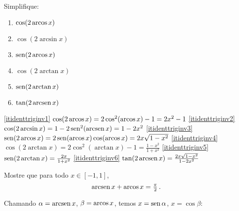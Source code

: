 \begin{exo} Simplifique:
\begin{multicols}{3}
 \begin{enumerate}
\item\label{itidenttriginv1} $\cos(2\operatorname{arcos} x)$
\item\label{itidenttriginv2} $\cos(2\arcsin x)$
\item\label{itidenttriginv3} $\operatorname{sen}(2\operatorname{arcos} x)$
\item\label{itidenttriginv4} $\cos(2\arctan x)$
\item\label{itidenttriginv5} $\operatorname{sen} (2\arctan x)$
\item\label{itidenttriginv6} $\tan (2\operatorname{arcsen} x)$
 \end{enumerate}
\end{multicols}
\vspace{0.01cm}
\begin{sol}
\eqref{itidenttriginv1} $\cos(2\operatorname{arcos} x)=2\cos^2(\operatorname{arcos} x)-1=2x^2-1$
\eqref{itidenttriginv2} $\cos(2\arcsin x)=1-2\operatorname{sen}^2(\operatorname{arcsen} x)=1-2x^2$
\eqref{itidenttriginv3} $\operatorname{sen}(2\operatorname{arcos} x)=2\operatorname{sen} (\operatorname{arcos} x)\cos (\operatorname{arcos} x)=2x\sqrt{1-x^2}$
\eqref{itidenttriginv4} $\cos(2\arctan x)=2\cos^2(\arctan x)-1=\tfrac{1-x^2}{1+x^2}$
\eqref{itidenttriginv5} $\operatorname{sen} (2\arctan x)=\frac{2x}{1+x^2}$
\eqref{itidenttriginv6} $\tan (2\operatorname{arcsen} x)=\frac{2x\sqrt{1-x^2}}{1-2x^2}$
\end{sol}
\end{exo}

\begin{exo}
Mostre que para todo $x\in [-1,1]$, 
$$
\operatorname{arcsen} x+\operatorname{arcos} x=\tfrac{\pi}{2}\,.
$$
\begin{sol}
Chamando $\alpha=\operatorname{arcsen} x$, $\beta=\operatorname{arcos} x$, temos $x=\operatorname{sen} \alpha$, $x=\cos \beta$:
\begin{center}
\begin{bmlimage}\end{bmlimage}
\end{center}
\end{sol}
\end{exo}









